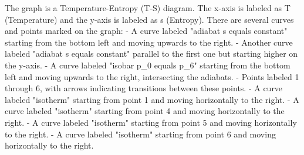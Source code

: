 The graph is a Temperature-Entropy (T-S) diagram. The x-axis is labeled as T (Temperature) and the y-axis is labeled as s (Entropy). There are several curves and points marked on the graph:
- A curve labeled "adiabat s equals constant" starting from the bottom left and moving upwards to the right.
- Another curve labeled "adiabat s equals constant" parallel to the first one but starting higher on the y-axis.
- A curve labeled "isobar p_0 equals p_6" starting from the bottom left and moving upwards to the right, intersecting the adiabats.
- Points labeled 1 through 6, with arrows indicating transitions between these points.
- A curve labeled "isotherm" starting from point 1 and moving horizontally to the right.
- A curve labeled "isotherm" starting from point 4 and moving horizontally to the right.
- A curve labeled "isotherm" starting from point 5 and moving horizontally to the right.
- A curve labeled "isotherm" starting from point 6 and moving horizontally to the right.